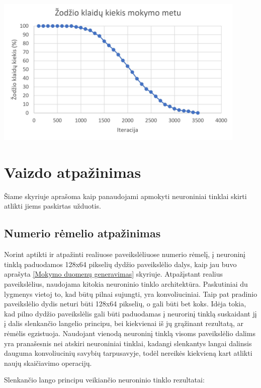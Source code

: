 \documentclass{VUMIFInfBakalaurinis}
\begin{document}
\begin{minipage}{\linewidth}
  \centering
  \includegraphics[width=12cm]{word_stats.jpg}
  \label{word_stats}
\end{minipage}





\pagebreak
\section{Vaizdo atpažinimas}
Šiame skyriuje aprašoma kaip panaudojami apmokyti neuroniniai tinklai skirti atlikti jiems paskirtas užduotis.

\subsection{Numerio rėmelio atpažinimas}
Norint aptikti ir atpažinti realiuose paveikslėliuose numerio rėmelį, į neuroninį tinklą paduodamos 128x64 pikselių dydžio
paveikslėlio dalys, kaip jau buvo aprašyta \ref{Mokymo duomenų generavimas} skyriuje.
Atpažįstant realius paveikslėlius, naudojama kitokia neuroninio tinklo architektūra. Paskutiniai du lygmenys vietoj to, 
kad būtų pilnai sujungti, yra konvoliuciniai. Taip pat pradinio paveikslėlio dydis neturi būti 128x64 pikselių, o gali būti
bet koks. Idėja tokia, kad pilno dydžio paveikslėlis gali būti paduodamas į neurorinį tinklą suskaidant jį į dalis slenkančio
langelio principu, bei kiekvienai iš jų grąžinant rezultatą, ar rėmėlis egzistuoja. Naudojant vienodą neuroninį tinklą visoms 
paveikslėlio dalims yra pranašesnis nei atskiri neuroniniai tinklai, kadangi slenkantys langai dalinsis dauguma konvoliucinių 
savybių tarpusavyje, todėl nereikės kiekvieną kart atlikti naujų skaičiavimo operacijų.

Slenkančio lango principu veikiančio neuroninio tinklo rezultatai:
\end{document}
